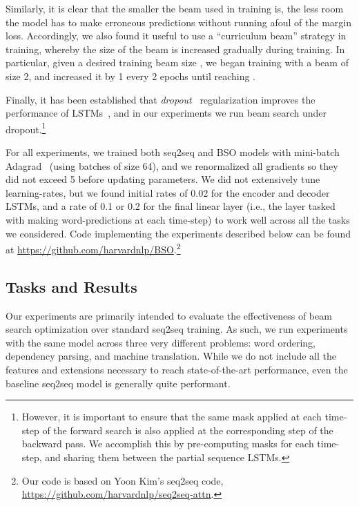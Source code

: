\documentclass[11pt,letterpaper]{article}
\begin{document}
Similarly, it is clear that the smaller the beam used in training is, the less room the model has to make erroneous predictions without running afoul of the margin loss. Accordingly, we also found it useful to use a ``curriculum beam'' strategy in training, whereby the size of the beam  is increased gradually during training. In particular, given a desired training beam size , we began training with a beam of size 2, and increased it by 1 every 2 epochs until reaching . 

Finally, it has been established that \textit{dropout}~\cite{srivastava14dropout} regularization improves the performance of LSTMs~\cite{pham14dropout,zaremba14rnn}, and in our experiments we run beam search under dropout.\footnote{However, it is important to ensure that the same mask applied at each time-step of the forward search is also applied at the corresponding step of the backward pass. We accomplish this by pre-computing masks for each time-step, and sharing them between the partial sequence LSTMs.}

For all experiments, we trained both seq2seq and BSO  models with mini-batch Adagrad~\cite{duchi2011adaptive} (using batches of size 64), and we renormalized all gradients so they did not exceed 5 before updating parameters. We did not extensively tune learning-rates, but we found initial rates of 0.02 for the encoder and decoder LSTMs, and a rate of 0.1 or 0.2 for
the final linear layer (i.e., the layer tasked with making word-predictions at each
time-step) to work well across all the tasks we considered. Code implementing the experiments described below can be found at \url{https://github.com/harvardnlp/BSO}.\footnote{Our code is based on Yoon Kim's seq2seq code, \url{https://github.com/harvardnlp/seq2seq-attn}.}

\subsection{Tasks and Results}
\label{sec:tasks}
Our experiments are primarily intended to evaluate the
effectiveness of beam search optimization over standard seq2seq training. As such, we run experiments with the same model across three very different problems: word ordering, dependency parsing, and machine translation. While we do not include all the features and extensions necessary to
reach state-of-the-art performance, even the baseline seq2seq model is generally quite performant.
\end{document}
